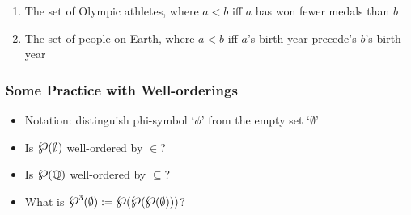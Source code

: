 \begin{frame}
\begin{enumerate}[<+->]
\item The set of Olympic athletes, where $a < b $ iff $a$ has won fewer medals than $b$

\item The set of people on Earth, where $a < b$ iff $a$'s birth-year precede's $b$'s birth-year




\end{enumerate}
\end{frame}

\begin{frame}
\frametitle{Some Practice with Well-orderings}

\begin{itemize}[<+->]

\item Notation: distinguish phi-symbol `$\phi$' from the empty set `$\emptyset$'

\item Is $\powerset(\emptyset)$ well-ordered by $\in$?

\item Is $\powerset(\mathbb{Q})$  well-ordered by $\subseteq$?

\item What is $\powerset^3(\emptyset) := \powerset (\powerset (\powerset (\emptyset))) $? 

\end{itemize}
\end{frame}

